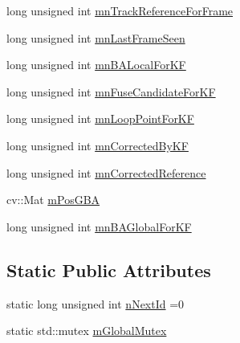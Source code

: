 \begin{DoxyCompactItemize}
long unsigned int \mbox{\hyperlink{class_o_r_b___s_l_a_m2_1_1_map_point_a19152183cfddc71b63650175def6aec7}{mn\+Track\+Reference\+For\+Frame}}
\item 
long unsigned int \mbox{\hyperlink{class_o_r_b___s_l_a_m2_1_1_map_point_aea3a63ce27fc39e536a6ceef7c1f3473}{mn\+Last\+Frame\+Seen}}
\item 
long unsigned int \mbox{\hyperlink{class_o_r_b___s_l_a_m2_1_1_map_point_ad4da26d02aa54a3e0be6a09e90fa39ec}{mn\+B\+A\+Local\+For\+KF}}
\item 
long unsigned int \mbox{\hyperlink{class_o_r_b___s_l_a_m2_1_1_map_point_aedba463c6440c2b448e9ec21acd58b9a}{mn\+Fuse\+Candidate\+For\+KF}}
\item 
long unsigned int \mbox{\hyperlink{class_o_r_b___s_l_a_m2_1_1_map_point_a44172716cac5a56004a60d165de8cfa2}{mn\+Loop\+Point\+For\+KF}}
\item 
long unsigned int \mbox{\hyperlink{class_o_r_b___s_l_a_m2_1_1_map_point_a86626462be01ad9a133dca0f5b49e688}{mn\+Corrected\+By\+KF}}
\item 
long unsigned int \mbox{\hyperlink{class_o_r_b___s_l_a_m2_1_1_map_point_ade5858af14ed7924d48dbf191ea5448c}{mn\+Corrected\+Reference}}
\item 
cv\+::\+Mat \mbox{\hyperlink{class_o_r_b___s_l_a_m2_1_1_map_point_a2669d92452bb1347a6a09700e369f049}{m\+Pos\+G\+BA}}
\item 
long unsigned int \mbox{\hyperlink{class_o_r_b___s_l_a_m2_1_1_map_point_abcef580d7b3562ea9025ea1dc2141b92}{mn\+B\+A\+Global\+For\+KF}}
\end{DoxyCompactItemize}
\subsection*{Static Public Attributes}
\begin{DoxyCompactItemize}
\item 
static long unsigned int \mbox{\hyperlink{class_o_r_b___s_l_a_m2_1_1_map_point_aa79702928d566db4fcd7716249bd96a2}{n\+Next\+Id}} =0
\item 
static std\+::mutex \mbox{\hyperlink{class_o_r_b___s_l_a_m2_1_1_map_point_a58d0ed9067593833efa652ea671ebf62}{m\+Global\+Mutex}}
\end{DoxyCompactItemize}
